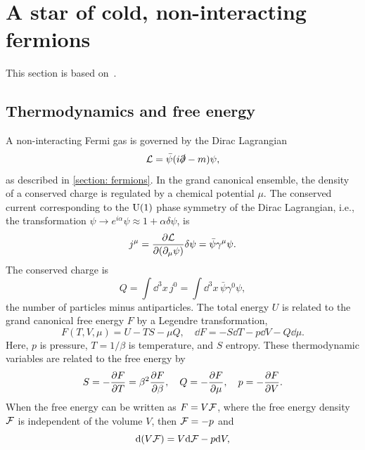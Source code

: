 \section{A star of cold, non-interacting fermions}
\label{section: cold fermi star}

This section is based on~\autocite{glendenningCompactStarsNuclear2012,andersenIntroductionStatisticalMechanics2012,kapustaFiniteTemperatureFieldTheory2006}.

\subsection{Thermodynamics and free energy}

A non-interacting Fermi gas is governed by the Dirac Lagrangian
%
\begin{equation}
    \mathcal{L} = \bar \psi (i \slashed \partial - m) \psi,
\end{equation}
%
as described in \autoref{section: fermions}.
In the grand canonical ensemble, the density of a conserved charge is regulated by a chemical potential $\mu$.
The conserved current corresponding to the $\text U(1)$ phase symmetry of the Dirac Lagrangian, i.e., the transformation $\psi \rightarrow e^{i \alpha} \psi \approx 1 + \alpha \delta \psi$, is
%
\begin{equation}
    j^\mu = \pdv{\mathcal{L}}{(\partial_\mu \psi)} \delta \psi = \bar \psi \gamma^\mu \psi.
\end{equation}
%
The conserved charge is
%
\begin{equation}
    Q = \int \dd^3 x \, j^0 = \int \dd^3 x\, \bar \psi \gamma^0 \psi,
\end{equation}
%
the number of particles minus antiparticles.
The total energy $U$ is related to the grand canonical free energy $F$ by a Legendre transformation,
%
\begin{equation}
    F(T, V, \mu) = U - T S - \mu Q, \quad \dd F = - S \dd T - p \dd V - Q \dd \mu.
\end{equation}
%
Here, $p$ is pressure, $T = {1}/{\beta}$ is temperature, and $S$ entropy.
These thermodynamic variables are related to the free energy by
%
\begin{equation}
    S = - \pdv{F}{T} = \beta^2 \pdv{F}{\beta}, \quad
    Q = - \pdv{F}{\mu}, \quad
    p = - \pdv{F}{V}.
\end{equation}
%
When the free energy can be written as $F = V \mathcal{F}$, where the free energy density $\mathcal{F}$ is independent of the volume $V$, then $\mathcal{F} = - p$ and
%
\begin{equation}
    \dd (V \mathcal{F}) = V \dd \mathcal{F} - p \dd V,
\end{equation}
